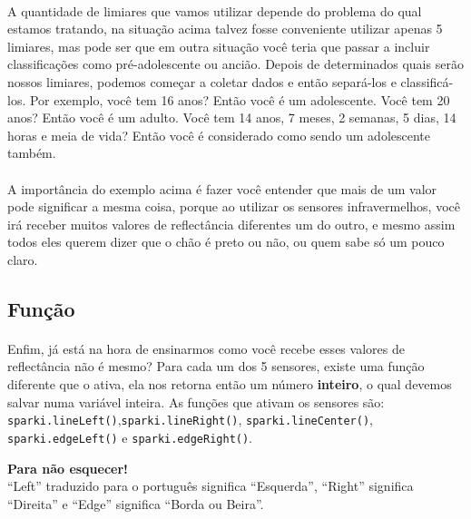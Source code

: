 \paragraph{}
A quantidade de limiares que vamos utilizar depende do problema do qual estamos tratando, na situação acima talvez fosse conveniente utilizar apenas 5 limiares, mas pode ser que em outra situação você teria que passar a incluir classificações como pré-adolescente ou ancião. Depois de determinados quais serão nossos limiares, podemos começar a coletar dados e então separá-los e classificá-los. Por exemplo, você tem 16 anos? Então você é um adolescente. Você tem 20 anos? Então você é um adulto. Você tem 14 anos, 7 meses, 2 semanas, 5 dias, 14 horas e meia de vida? Então você é considerado como sendo um adolescente também.

\paragraph{}
A importância do exemplo acima é fazer você entender que mais de um valor pode significar a mesma coisa, porque ao utilizar os sensores infravermelhos, você irá receber muitos valores de reflectância diferentes um do outro, e mesmo assim todos eles querem dizer que o chão é preto ou não, ou quem sabe só um pouco claro.

\subsection{Função}
\paragraph{}
Enfim, já está na hora de ensinarmos como você recebe esses valores de reflectância não é mesmo? Para cada um dos 5 sensores, existe uma função diferente que o ativa, ela nos retorna então um número \textbf{inteiro}, o qual devemos salvar numa variável inteira. As funções que ativam os sensores são: \lstinline[columns=fixed]{sparki.lineLeft()},\lstinline[columns=fixed]{sparki.lineRight()}, \lstinline[columns=fixed]{sparki.lineCenter()}, \lstinline[columns=fixed]{sparki.edgeLeft()} e \lstinline[columns=fixed]{sparki.edgeRight()}.

    \begin{center}
    \textcolor{mydarkblue}{\textbf{Para não esquecer!}}
    \\``Left'' traduzido para o português significa ``Esquerda'', ``Right'' significa ``Direita'' e ``Edge'' significa ``Borda ou Beira''.
    \end{center}
    
